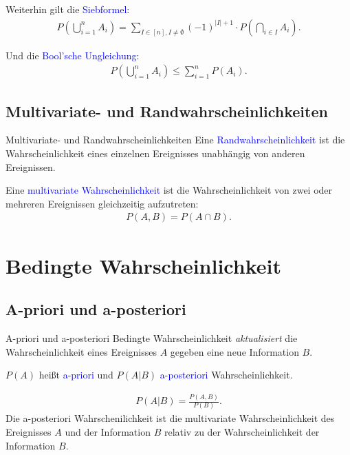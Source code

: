 \documentclass{beamer}
\def\padding{\vspace{0.5cm}}
\def\spadding{\vspace{0.25cm}}
\def\b{\textcolor{blue}}
\begin{document}
\begin{frame}
    Weiterhin gilt die \b{Siebformel}:
    \begin{align*}
        P(\bigcup_{i=1}^n A_i) = \sum_{I \in [n], I \neq \emptyset} (-1)^{|I| + 1} \cdot P(\bigcap_{i \in I} A_i).
    \end{align*}\pause\par\padding
    Und die \b{Bool'sche Ungleichung}:
    \begin{align*}
        P(\bigcup_{i=1}^n A_i) \leq \sum_{i=1}^n P(A_i).
    \end{align*}
\end{frame}

\subsection{Multivariate- und Randwahrscheinlichkeiten}
\begin{frame}{Multivariate- und Randwahrscheinlichkeiten}
    Eine \b{Randwahrscheinlichkeit} ist die Wahrscheinlichkeit eines einzelnen Ereignisses unabhängig von anderen Ereignissen.\pause\par\spadding
    Eine \b{multivariate Wahrscheinlichkeit} ist die Wahrscheinlichkeit von zwei oder mehreren Ereignissen gleichzeitig aufzutreten:
    \begin{align*}
        P(A,B) = P(A \cap B).
    \end{align*}
\end{frame}

\section{Bedingte Wahrscheinlichkeit}
\subsection{A-priori und a-posteriori}
\begin{frame}{A-priori und a-posteriori}
    Bedingte Wahrscheinlichkeit \textit{aktualisiert} die Wahrscheinlichkeit eines Ereignisses $A$ gegeben eine neue Information $B$.\pause\par\padding
    $P(A)$ heißt \b{a-priori} und $P(A|B)$ \b{a-posteriori} Wahrscheinlichkeit.\pause\par\padding
    \begin{align*}
        P(A|B) = \frac{P(A,B)}{P(B)}.
    \end{align*}
    Die a-posteriori Wahrschenilichkeit ist die multivariate Wahrscheinlichkeit des Ereignisses $A$ und der Information $B$ relativ zu der Wahrscheinlichkeit der Information $B$.
\end{frame}
\end{document}
